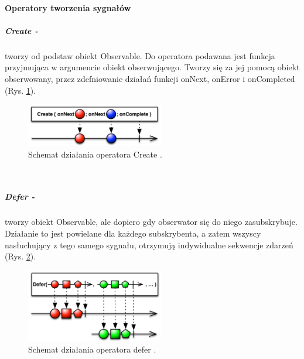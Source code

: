 \documentclass[12pt,oneside,a4paper]{report}
\begin{document}
\paragraph{Operatory tworzenia sygnałów}
\subparagraph{Create -}tworzy od podstaw obiekt Observable. Do operatora podawana jest funkcja przyjmująca w argumencie obiekt obserwującego. Tworzy się za jej pomocą obiekt obserwowany, przez zdefniowanie działań funkcji onNext, onError i onCompleted (Rys. \ref{create}). 
\begin{figure}[ht!]
	\centering
	\includegraphics[width=6cm]{create}
	\caption{Schemat działania operatora Create \cite{operators}.}
	\label{create}
\end{figure}\\
\subparagraph{Defer -}tworzy obiekt Observable, ale dopiero gdy obserwator się do niego zasubskrybuje. Działanie to jest powielane dla każdego subskrybenta, a zatem wszyscy nasłuchujący z tego samego sygnału, otrzymują indywidualne sekwencje zdarzeń (Rys. \ref{defer}). 
\begin{figure}[ht!]
	\centering
	\includegraphics[width=6cm]{defer}
	\caption{Schemat działania operatora defer \cite{operators}.}
	\label{defer}
\end{figure}\\\\\\\\\\\\
\end{document}
